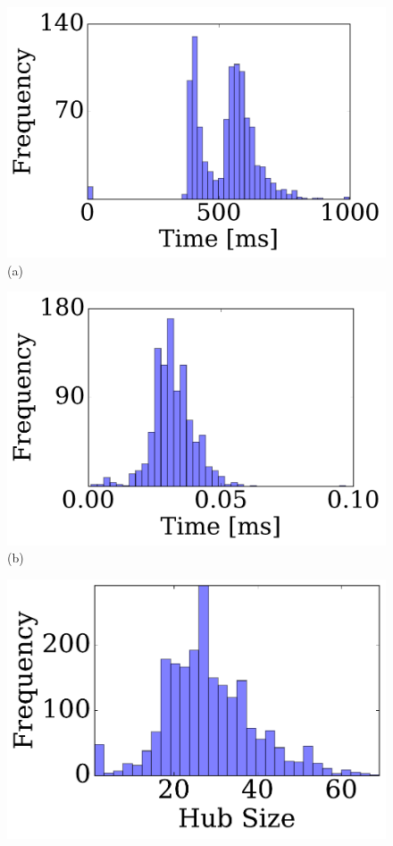\documentclass[opre,nonblindrev]{informs3} %
\begin{document}
\begin{figure}[h]
\begin{minipage}[t]{.28\textwidth}
\centering
\includegraphics[clip, trim=0.2cm 0.3cm 0.4cm 0.2cm,scale=0.225]{TexImg/SF_query_dij_B25.pdf}\\
(a)
\end{minipage}%
\begin{minipage}[t]{.24\textwidth}
\centering
\includegraphics[clip, trim=1.65cm 0.3cm 0.2cm 0.2cm,scale=0.225]{TexImg/SF_query_hl_B25.pdf}\\
(b)
\end{minipage}%
\begin{minipage}[t]{.24\textwidth}
\centering
\includegraphics[clip, trim = 1.3cm 0.3cm 0cm 0cm,scale=0.225]{TexImg/SF_bwd_hub_size.pdf}\\

\end{minipage}
\end{figure}
\end{document}
